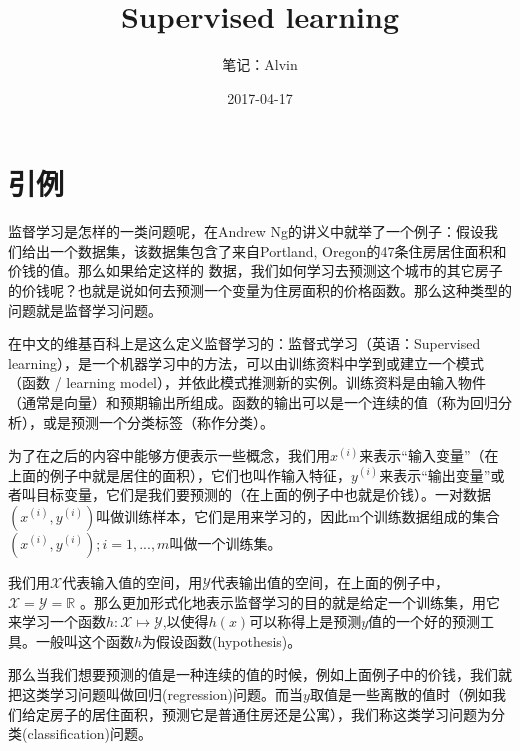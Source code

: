 \documentclass[UTF8]{ctexart}
\begin{document}
\title{Supervised learning}
\author{笔记：Alvin}
\date{2017-04-17}

\maketitle

\tableofcontents
\newpage

\section{引例}
监督学习是怎样的一类问题呢，在Andrew Ng的讲义中就举了一个例子：假设我们给出一个数据集，该数据集包含了来自Portland, Oregon的47条住房居住面积和价钱的值。那么如果给定这样的
数据，我们如何学习去预测这个城市的其它房子的价钱呢？也就是说如何去预测一个变量为住房面积的价格函数。那么这种类型的问题就是监督学习问题。

在中文的维基百科上是这么定义监督学习的：监督式学习（英语：Supervised learning），是一个机器学习中的方法，可以由训练资料中学到或建立一个模式（函数 / learning model），并依此模式推测新的实例。训练资料是由输入物件（通常是向量）和预期输出所组成。函数的输出可以是一个连续的值（称为回归分析），或是预测一个分类标签（称作分类）。

为了在之后的内容中能够方便表示一些概念，我们用$x^{(i)}$来表示“输入变量”（在上面的例子中就是居住的面积），它们也叫作输入特征，$y^{(i)}$来表示“输出变量”或者叫目标变量，它们是我们要预测的（在上面的例子中也就是价钱）。一对数据$(x^{(i)},y^{(i)})$叫做训练样本，它们是用来学习的，因此m个训练数据组成的集合${(x^{(i)},y^{(i)});i=1,...,m}$叫做一个训练集。

\begin{figure}[htb]        
\end{figure}

我们用$\mathcal{X}$代表输入值的空间，用$\mathcal{Y}$代表输出值的空间，在上面的例子中，$  \mathcal{X}=  \mathcal{Y}= \mathbb{R}$ 。那么更加形式化地表示监督学习的目的就是给定一个训练集，用它来学习一个函数$h:\mathcal{X} \mapsto \mathcal{Y}$,以使得$h(x)$可以称得上是预测$y$值的一个好的预测工具。一般叫这个函数$h$为假设函数(hypothesis)。

那么当我们想要预测的值是一种连续的值的时候，例如上面例子中的价钱，我们就把这类学习问题叫做回归(regression)问题。而当$y$取值是一些离散的值时（例如我们给定房子的居住面积，预测它是普通住房还是公寓），我们称这类学习问题为分类(classification)问题。
\end{document}

